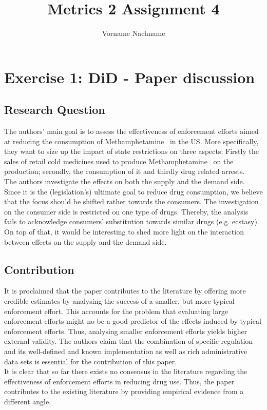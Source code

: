 \documentclass[%
  fontsize=11pt, %
  version=last,%
  headsepline,
  titlepage = false,
  DIV = 11, %
  abstract = false
]{scrartcl}
\title{Metrics 2 Assignment 4} %
\author{Vorname Nachname}	%
\newcommand{\meth}{Methamphetamine} %
\begin{document}
\maketitle %


\section*{Exercise 1: DiD - Paper discussion}
\subsection*{Research Question}
The authors' main goal is to assess the effectiveness of enforcement efforts aimed at reducing the consumption of \meth~ in the US. More specifically, they want to size up the impact of state restrictions on three aspects: Firstly the sales of retail cold medicines used to produce \meth~ on the production; secondly, the consumption of it and thirdly drug related arrests.\\
The authors investigate the effects on both the supply and the demand side. Since it is the (legislation's) ultimate goal to reduce drug consumption, we believe that the focus should be shifted rather towards the consumers. The investigation on the consumer side is restricted on one type of drugs. Thereby, the analysis fails to acknowledge consumers' substitution towards similar drugs (e.g. ecstasy). On top of that, it would be interesting to shed more light on the interaction between effects on the supply and the demand side.

\subsection*{Contribution}
It is proclaimed that the paper contributes to the literature by offering more credible estimates by analysing the success of a smaller, but more typical enforcement effort. This accounts for the problem that evaluating large enforcement efforts might no be a good predictor of the effects induced by typical enforcement efforts. Thus, analysing smaller enforcement efforts yields higher external validity. The authors claim that the combination of specific regulation and its well-defined and known implementation as well as rich administrative data sets is essential for the contribution of this paper.\\
It is clear that so far there exists no consensus in the literature regarding the effectiveness of enforcement efforts in reducing drug use. Thus, the paper contributes to the existing literature by providing empirical evidence from a different angle.
\end{document}
